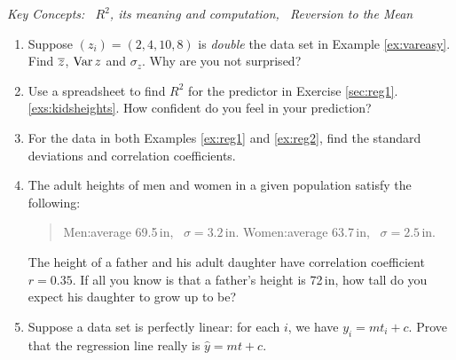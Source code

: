 \begin{exercises}{}{}
	\hangindent\leftmargini\emph{Key Concepts: \ $R^2$, its meaning and computation, \ Reversion to the Mean} 
	
	\begin{enumerate}
	  \item Suppose $(z_i)=(2,4,10,8)$ is \emph{double} the data set in Example \ref{ex:vareasy}. Find $\overline{z}$, $\operatorname{Var} z$ and $\sigma_z$. Why are you not surprised?
	  
	  
	  \item Use a spreadsheet to find $R^2$ for the predictor in Exercise \ref*{sec:reg1}.\ref{exs:kidsheights}. How confident do you feel in your prediction?
	  
	  
	  \item For the data in both Examples \ref{ex:reg1} and \ref{ex:reg2}, find the standard deviations and correlation coefficients.
	  
	  
	  \item The adult heights of men and women in a given population satisfy the following:
	  \begin{quote}
	  	Men:\lstsp average 69.5\,in, \ $\sigma=3.2$\,in.\qquad
	  	Women:\lstsp average 63.7\,in, \ $\sigma=2.5$\,in.
	  \end{quote}
	  The height of a father and his adult daughter have correlation coefficient $r=0.35$. If all you know is that a father's height is 72\,in, how tall do you expect his daughter to grow up to be?
	  
	  
	  \item Suppose a data set is perfectly linear: for each $i$, we have $y_i=mt_i+c$. Prove that the regression line really is $\hat y=mt+c$.
	  

\end{enumerate}
\end{exercises}

